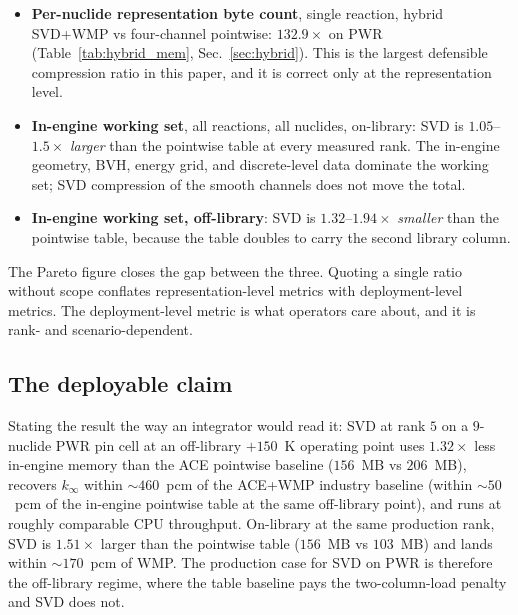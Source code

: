 \begin{itemize}
\item \textbf{Per-nuclide representation byte count}, single
reaction, hybrid SVD+WMP vs four-channel pointwise:
$132.9\times$ on PWR (Table~\ref{tab:hybrid_mem},
Sec.~\ref{sec:hybrid}). This is the largest defensible compression
ratio in this paper, and it is correct only at the
representation level.
\item \textbf{In-engine working set}, all reactions, all
nuclides, on-library: SVD is $1.05$--$1.5\times$ \emph{larger}
than the pointwise table at every measured rank. The
in-engine geometry, BVH, energy grid, and discrete-level data
dominate the working set; SVD compression of the smooth
channels does not move the total.
\item \textbf{In-engine working set, off-library}: SVD is
$1.32$--$1.94\times$ \emph{smaller} than the pointwise table,
because the table doubles to carry the second library column.
\end{itemize}

The Pareto figure closes the gap between the three. Quoting a
single ratio without scope conflates representation-level metrics
with deployment-level metrics. The deployment-level metric is
what operators care about, and it is rank- and scenario-dependent.

\subsection{The deployable claim}

Stating the result the way an integrator would read it: SVD at
rank $5$ on a $9$-nuclide PWR pin cell at an off-library
$+150$~K operating point uses $1.32\times$ less in-engine
memory than the ACE pointwise baseline ($156$~MB vs
$206$~MB), recovers $k_\infty$ within $\sim\!460$~pcm of
the ACE+WMP industry baseline (within $\sim\!50$~pcm of
the in-engine pointwise table at the same off-library
point), and runs at roughly comparable CPU throughput.
On-library at the same production rank, SVD is
$1.51\times$ larger than the pointwise table ($156$~MB vs
$103$~MB) and lands within $\sim\!170$~pcm of WMP. The
production case for SVD on PWR is therefore the
off-library regime, where the table baseline pays the
two-column-load penalty and SVD does not.
